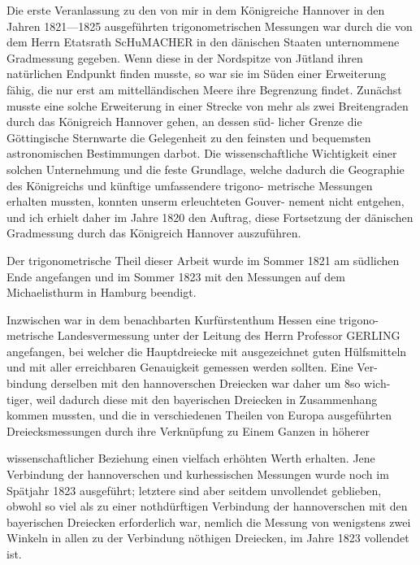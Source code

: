 \documentclass[12pt,a4paper]{article}
\theoremstyle{plain}
\theoremstyle{definition}
\theoremstyle{remark}
\begin{document}
\noindent
Die erste Veranlassung zu den von mir in dem Königreiche Hannover
in den Jahren 1821---1825 ausgeführten trigonometrischen Messungen war
durch die von dem Herrn Etatsrath ScHuMACHER in den dänischen Staaten
unternommene Gradmessung gegeben. Wenn diese in der Nordspitze von
Jütland ihren natürlichen Endpunkt finden musste, so war sie im Süden einer
Erweiterung fähig, die nur erst am mittelländischen Meere ihre Begrenzung
findet. Zunächst musste eine solche Erweiterung in einer Strecke von mehr
als zwei Breitengraden durch das Königreich Hannover gehen, an dessen süd-
licher Grenze die Göttingische Sternwarte die Gelegenheit zu den feinsten
und bequemsten astronomischen Bestimmungen darbot. Die wissenschaftliche
Wichtigkeit einer solchen Unternehmung und die feste Grundlage, welche
dadurch die Geographie des Königreichs und künftige umfassendere trigono-
metrische Messungen erhalten mussten, konnten unserm erleuchteten Gouver-
nement nicht entgehen, und ich erhielt daher im Jahre 1820 den Auftrag,
diese Fortsetzung der dänischen Gradmessung durch das Königreich Hannover
auszuführen.

\noindent
Der trigonometrische Theil dieser Arbeit wurde im Sommer 1821 am
südlichen Ende angefangen und im Sommer 1823 mit den Messungen auf dem
Michaelisthurm in Hamburg beendigt.

\noindent
Inzwischen war in dem benachbarten Kurfürstenthum Hessen eine trigono-
metrische Landesvermessung unter der Leitung des Herrn Professor GERLING
angefangen, bei welcher die Hauptdreiecke mit ausgezeichnet guten Hülfsmitteln
und mit aller erreichbaren Genauigkeit gemessen werden sollten. Eine Ver-
bindung derselben mit den hannoverschen Dreiecken war daher um 8so wich-
tiger, weil dadurch diese mit den bayerischen Dreiecken in Zusammenhang
kommen mussten, und die in verschiedenen Theilen von Europa ausgeführten
Dreiecksmessungen durch ihre Verknüpfung zu Einem Ganzen in höherer

\noindent

\noindent

\noindent
wissenschaftlicher Beziehung einen vielfach erhöhten Werth erhalten. Jene
Verbindung der hannoverschen und kurhessischen Messungen wurde noch
im Spätjahr 1823 ausgeführt; letztere sind aber seitdem unvollendet geblieben,
obwohl so viel als zu einer nothdürftigen Verbindung der hannoverschen mit
den bayerischen Dreiecken erforderlich war, nemlich die Messung von wenigstens
zwei Winkeln in allen zu der Verbindung nöthigen Dreiecken, im Jahre
1823 vollendet ist.
\end{document}
